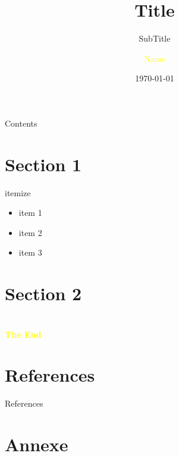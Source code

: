 \documentclass[aspectratio=43]{beamer}
\title{Title} %
\subtitle{SubTitle}
\author[Short Name]{\textcolor{yellow}{Name}}
\institute[UdeS]{
    \textcolor{white}{Département de physique}%
    \\%
    \textcolor{white}{Université de Sherbrooke}%
}
\date{\today}
\begin{document}
\frame{\titlepage}

\begin{frame}{Contents}
    \tableofcontents
\end{frame}


\section{Section 1}
\begin{frame}{}
\end{frame}
\begin{frame}{itemize}
    \begin{itemize}[<+->]
        \item item 1
        \item item 2
        \item item 3
    \end{itemize}
\end{frame}


\section{Section 2}
\begin{frame}{}

\end{frame}



\section{}
\begin{frame}{}
    \centering
        \Huge\bfseries
    \textcolor{yellow}{The End}
\end{frame}

\section*{References}
\begin{frame}{References}
    \begingroup
    \fontsize{2pt}{12pt}\selectfont
    \printbibliography
    \endgroup
\end{frame}


\section*{Annexe}


    
\end{document}
